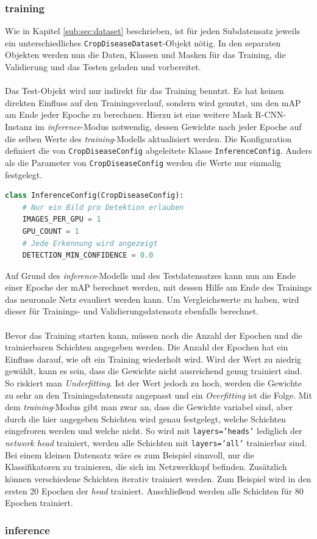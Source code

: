 \subsubsection{training}

Wie in Kapitel \ref{sub:sec:dataset} beschrieben, ist für jeden Subdatensatz jeweils ein unterschiedliches \texttt{CropDiseaseDataset}-Objekt nötig. In den separaten Objekten werden nun die Daten, Klassen und Masken für das Training, die Validierung und das Testen geladen und vorbereitet.
\\\\
Das Test-Objekt wird nur indirekt für das Training benutzt. Es hat keinen direkten Einfluss auf den Trainingsverlauf, sondern wird genutzt, um den mAP am Ende jeder Epoche zu berechnen. Hierzu ist eine weitere Mask R-CNN-Instanz im \textit{inference}-Modus notwendig, dessen Gewichte nach jeder Epoche auf die selben Werte des \textit{training}-Modells aktualisiert werden. Die Konfiguration definiert die von \texttt{CropDiseaseConfig} abgeleitete Klasse \texttt{InferenceConfig}. Anders als die Parameter von \texttt{CropDiseaseConfig} werden die Werte nur einmalig festgelegt.
\begin{lstlisting}[language=python,caption={InferenceConfig},captionpos=b]
class InferenceConfig(CropDiseaseConfig):
	# Nur ein Bild pro Detektion erlauben
	IMAGES_PER_GPU = 1
	GPU_COUNT = 1
	# Jede Erkennung wird angezeigt
	DETECTION_MIN_CONFIDENCE = 0.0
\end{lstlisting}
Auf Grund des \textit{inference}-Modells und des Testdatensatzes kann nun am Ende einer Epoche der mAP berechnet werden, mit dessen Hilfe am Ende des Trainings das neuronale Netz evauliert werden kann. Um Vergleichswerte zu haben, wird dieser für Trainings- und Validierungsdatensatz ebenfalls berechnet. 
\\\\
Bevor das Training starten kann, müssen noch die Anzahl der Epochen und die trainierbaren Schichten angegeben werden. Die Anzahl der Epochen hat ein Einfluss darauf, wie oft ein Training wiederholt wird. Wird der Wert zu niedrig gewählt, kann es sein, dass die Gewichte nicht ausreichend genug trainiert sind. So riskiert man \textit{Underfitting}. Ist der Wert jedoch zu hoch, werden die Gewichte zu sehr an den Trainingsdatensatz angepasst und ein \textit{Overfitting} ist die Folge. Mit dem \textit{training}-Modus gibt man zwar an, dass die Gewichte variabel sind, aber durch die hier angegeben Schichten wird genau festgelegt, welche Schichten eingefroren werden und welche nicht. So wird mit \texttt{layers='heads'} lediglich der \textit{network head} trainiert, werden alle Schichten mit \texttt{layers='all'} trainierbar sind. Bei einem kleinen Datensatz wäre es zum Beispiel sinnvoll, nur die Klassifikatoren zu trainieren, die sich im Netzwerkkopf befinden. Zusätzlich können verschiedene Schichten iterativ trainiert werden. Zum Beispiel wird in den ersten 20 Epochen der \textit{head} trainiert. Anschließend werden alle Schichten für 80 Epochen trainiert.

\subsubsection{inference}